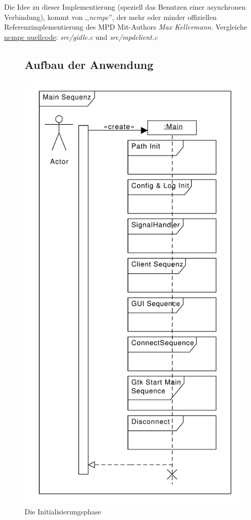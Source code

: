 Die Idee zu dieser Implementierung (speziell das Benutzen einer asynchronen Verbindung), kommt von ,,\textit{ncmpc}'',
der mehr oder minder offiziellen Referenzimplementierung des MPD Mit-Authors \emph{Max Kellermann}.
Vergleiche \href{http://mpd.wikia.com/wiki/Client:Ncmpc}{ncmpc quellcode}: \textit{src/gidle.c} und \textit{src/mpdclient.c}
\begin{figure}[htb!]
\subsection{Aufbau der Anwendung}
	\centering
        \includegraphics[scale=0.3]{./gfx/seq/main}
	\caption{Die Initialisierungsphase}
	\label{seq_main_init}
\end{figure}

\newpage

